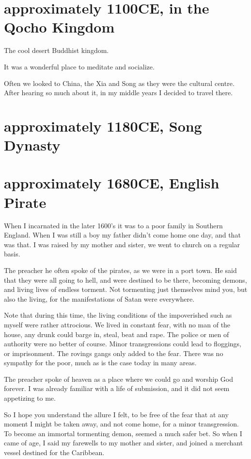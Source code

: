 \chapter{approximately 1100CE, in the Qocho Kingdom}
The cool desert Buddhist kingdom.

It was a wonderful place to meditate and socialize. 

Often we looked to China, the Xia and Song as they were the cultural centre. 
After hearing so much about it, in my middle years I decided to travel there.

\chapter{approximately 1180CE, Song Dynasty}

\chapter{approximately 1680CE, English Pirate}\label{reincarnation:pirate}

When I incarnated in the later 1600’s it was to a poor family in Southern England. When I was still a boy my father didn’t come home one day, and that was that.  I was raised by my mother and sister, we went to church on a regular basis.

The preacher he often spoke of the pirates, as we were in a port town.  He said
that they were all going to hell, and were destined to be there, becoming
demons, and living lives of endless torment. Not tormenting just themselves mind
you, but also the living, for the manifestations of Satan were everywhere.

Note that during this time, the living conditions of the impoverished such as myself were rather attrocious. We lived in constant fear, with no man of the house, any drunk could barge in, steal, beat and rape. The police or men of authority were no better of course. Minor transgressions could lead to floggings, or imprisonment. The rovings gangs only added to the fear.  There was no sympathy for the poor, much as is the case today in many areas.

The preacher spoke of heaven as a place where we could go and worship God
forever. I was already familiar with a life of submission, and it did not seem
appetizing to me.

So I hope you understand the allure I felt, to be free of the fear that at any
moment I might be taken away, and not come home, for a minor transgression. To
become an immortal tormenting demon, seemed a much safer bet.  So when I came of
age, I said my farewells to my mother and sister, and joined a merchant vessel
destined for the Caribbean.

